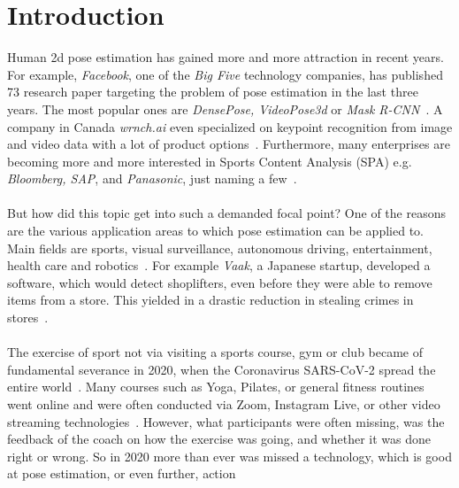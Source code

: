 


\chapter{Introduction} %

\label{introduction} %
Human 2d pose estimation has gained more and more attraction in recent years.
For example, \textit{Facebook}, one of the \textit{Big Five} technology companies, has published 73 research paper targeting the
problem of pose estimation in the last three years.
The most popular ones are \textit{DensePose, VideoPose3d} or \textit{Mask R-CNN}~\cite{fbPub, DensePose, videopose3d, maskrcnn}.
A company in Canada \textit{wrnch.ai} even specialized on keypoint recognition from image and video data with a
lot of product options~\cite{wrnch}.
Furthermore, many enterprises are becoming more and more interested in Sports Content Analysis (SPA)
e.g. \textit{Bloomberg, SAP}, and \textit{Panasonic}, just naming a few~\cite{sappanasonic, spaBloomberg}.
\\\mbox{}\\
But how did this topic get into such a demanded focal point?
One of the reasons are the various application areas to which pose estimation can be applied to.
Main fields are sports, visual surveillance, autonomous driving, entertainment, health care and
robotics~\cite{olympicsport, surveillance, kinectWalkDepression}.
For example \textit{Vaak}, a Japanese startup, developed a software, which would detect shoplifters,
even before they were able to remove items from a store.
This yielded in a drastic reduction in stealing crimes in stores~\cite{vaak}.
\\\mbox{}\\
The exercise of sport not via visiting a sports course, gym or club became of fundamental severance in 2020,
when the Coronavirus SARS-CoV-2 spread the entire world~\cite{coronarki}.
Many courses such as Yoga, Pilates, or general fitness routines went online
and were often conducted via Zoom, Instagram Live, or other video streaming technologies~\cite{coronalife}.
However, what participants were often missing, was the feedback of the coach on how the exercise was going, and
whether it was done right or wrong.
So in 2020 more than ever was missed a technology, which is good at pose estimation, or even further, action
